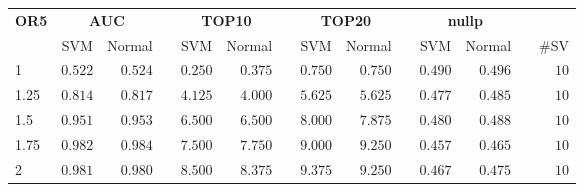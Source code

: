 \documentclass{article}\usepackage[]{graphicx}\usepackage[]{color}
\begin{document}
%
\begin{table}[!tbp]
\begin{center}
\begin{tabular}{lrrcrrcrrcrrcr}
\hline\hline
\multicolumn{1}{l}{\bfseries OR5}&\multicolumn{2}{c}{\bfseries AUC}&\multicolumn{1}{c}{\bfseries }&\multicolumn{2}{c}{\bfseries TOP10}&\multicolumn{1}{c}{\bfseries }&\multicolumn{2}{c}{\bfseries TOP20}&\multicolumn{1}{c}{\bfseries }&\multicolumn{2}{c}{\bfseries nullp}&\multicolumn{1}{c}{\bfseries }&\multicolumn{1}{c}{\bfseries }\tabularnewline
\cline{2-3} \cline{5-6} \cline{8-9} \cline{11-12}
\multicolumn{1}{l}{}&\multicolumn{1}{c}{SVM}&\multicolumn{1}{c}{Normal}&\multicolumn{1}{c}{}&\multicolumn{1}{c}{SVM}&\multicolumn{1}{c}{Normal}&\multicolumn{1}{c}{}&\multicolumn{1}{c}{SVM}&\multicolumn{1}{c}{Normal}&\multicolumn{1}{c}{}&\multicolumn{1}{c}{SVM}&\multicolumn{1}{c}{Normal}&\multicolumn{1}{c}{}&\multicolumn{1}{c}{\#SV}\tabularnewline
\hline
1&$0.522$&$0.524$&&$0.250$&$0.375$&&$0.750$&$0.750$&&$0.490$&$0.496$&&$10$\tabularnewline
1.25&$0.814$&$0.817$&&$4.125$&$4.000$&&$5.625$&$5.625$&&$0.477$&$0.485$&&$10$\tabularnewline
1.5&$0.951$&$0.953$&&$6.500$&$6.500$&&$8.000$&$7.875$&&$0.480$&$0.488$&&$10$\tabularnewline
1.75&$0.982$&$0.984$&&$7.500$&$7.750$&&$9.000$&$9.250$&&$0.457$&$0.465$&&$10$\tabularnewline
2&$0.981$&$0.980$&&$8.500$&$8.375$&&$9.375$&$9.250$&&$0.467$&$0.475$&&$10$\tabularnewline
\hline
\end{tabular}
\end{center}
\end{table}
\end{document}
